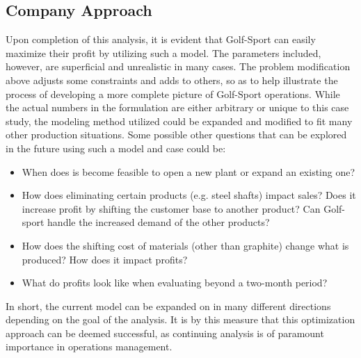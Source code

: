\documentclass{article}
\begin{document}
\subsection{Company Approach}
Upon completion of this analysis, it is evident that Golf-Sport can easily maximize their profit by utilizing such a model.  The parameters included, however, are superficial and unrealistic in many cases.  The problem modification above adjusts some constraints and adds to others, so as to help illustrate the process of developing a more complete picture of Golf-Sport operations.  While the actual numbers in the formulation are either arbitrary or unique to this case study, the modeling method utilized could be expanded and modified to fit many other production situations.  Some possible other questions that can be explored in the future using such a model and case could be:
\begin{itemize}
	\item When does is become feasible to open a new plant or expand an existing one?
	\item How does eliminating certain products (e.g. steel shafts) impact sales? Does it increase profit by shifting the customer base to another product? Can Golf-sport handle the increased demand of the other products?
	\item How does the shifting cost of materials (other than graphite) change what is produced? How does it impact profits?
	\item What do profits look like when evaluating beyond a two-month period?
\end{itemize}
In short, the current model can be expanded on in many different directions depending on the goal of the analysis.  It is by this measure that this optimization approach can be deemed successful, as continuing analysis is of paramount importance in operations management.
\end{document}
